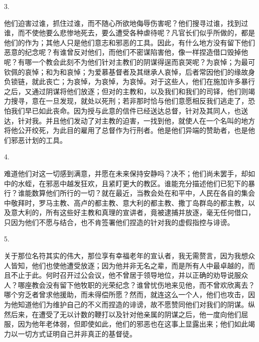 3. \par

他们迫害过谁，抓住过谁，而不随心所欲地侮辱伤害呢？他们搜寻过谁，找到过谁，而不使他要么悲惨地死去，要么遭受各种虐待呢？凡官长们似乎所做的，都是他们的作为；其他人只是他们意志和邪恶的工具。因此，有什么地方没有留下他们恶意的纪念呢？有谁曾反对他们，而他们不密谋陷害他，像一样捏造借口毁掉他呢？有哪一个教会此刻不为他们针对主教们的阴谋得逞而哀哭呢？为哀悼；为最可钦佩的哀悼；和为和哀悼；为爱慕基督者及其继承人哀悼，后者常因他们的缘故身负锁链，就此丧亡；为哀悼，为哀悼，为哀悼。对于这些人，他们在施加许多暴行之后，又通过阴谋将他们放逐；但对的主教和，以及我们和我们的司铎，他们则竭力搜寻，意在一旦发现，就处以死刑；若非那时恰与他们意愿相反我们逃走了，恐怕我们早已如此丧命。因为授与此意的信件已经送达总督，针对及其同人，也送达，针对我。并且他们发动了对主教的迫害，一找到他，就使人在一个名叫的地方将他公开绞死，为此目的雇用了总督作为行刑者。他是他们异端的赞助者，也是他们邪恶计划的工具。\par

4. \par

难道他们对这一切感到满意，并愿在未来保持安静吗？决不；他们尚未罢手，却如中的水蛭，在邪恶中越发狂欢，且紧盯更大的教区。谁能充分描述他们已犯下的暴行？谁能数算他们所行的一切？就在最近，当教会处在和平中，人民在各自的集会中敬拜时，罗马主教、高卢的都主教、意大利的都主教、撒丁岛群岛的都主教，以及意大利的，所有这些好主教和真理的宣讲者，竟被逮捕并放逐，毫无任何借口，只因为他们不愿与结合，也不肯签署他们捏造的针对我的虚假指控与诽谤。\par

5. \par

关于那位名符其实的伟大，那位享有幸福老年的宣认者，我无需赘言，因为我想众人皆知，他们也使他遭受放逐；因为他并非无名之辈，而是所有人中最卓越的，而且不止于此。何时召开过公会议，他不曾居于领导地位，并以正确的劝导说服众人？哪座教会没有留下他牧职的光荣纪念？谁曾忧伤地来见他，而不曾欢欣离去？哪个穷乏者曾求他援助，而未得偿所愿？然而，就连这么一个人，他们也攻击，因为他知道他们为维护自己的不义而捏造的诽谤，故不愿赞同他们对我们的阴谋。纵然后来，在遭受了无以计数的鞭打以及针对他亲属的阴谋之后，他一度向他们屈服，因为他年老体弱，但即使如此，他们的邪恶也在这事上显露出来；他们如此竭力以一切方式证明自己并非真正的基督徒。\par

